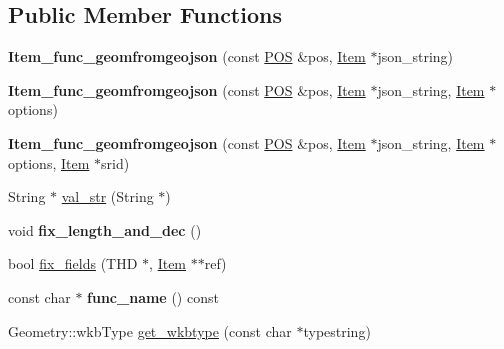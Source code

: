 \subsection*{Public Member Functions}
\begin{DoxyCompactItemize}
\item 
\mbox{\label{classItem__func__geomfromgeojson_aeb116792c0b6068b50ee6f39e3553de6}} 
{\bfseries Item\+\_\+func\+\_\+geomfromgeojson} (const \mbox{\hyperlink{structYYLTYPE}{P\+OS}} \&pos, \mbox{\hyperlink{classItem}{Item}} $\ast$json\+\_\+string)
\item 
\mbox{\label{classItem__func__geomfromgeojson_a93fccb34e1f16151349f31d7d062c2e0}} 
{\bfseries Item\+\_\+func\+\_\+geomfromgeojson} (const \mbox{\hyperlink{structYYLTYPE}{P\+OS}} \&pos, \mbox{\hyperlink{classItem}{Item}} $\ast$json\+\_\+string, \mbox{\hyperlink{classItem}{Item}} $\ast$options)
\item 
\mbox{\label{classItem__func__geomfromgeojson_abfac62c4f62832e95f8b1940ed6ff657}} 
{\bfseries Item\+\_\+func\+\_\+geomfromgeojson} (const \mbox{\hyperlink{structYYLTYPE}{P\+OS}} \&pos, \mbox{\hyperlink{classItem}{Item}} $\ast$json\+\_\+string, \mbox{\hyperlink{classItem}{Item}} $\ast$options, \mbox{\hyperlink{classItem}{Item}} $\ast$srid)
\item 
String $\ast$ \mbox{\hyperlink{classItem__func__geomfromgeojson_a6b2fff2154b1698c3fd3dfceaf3fa879}{val\+\_\+str}} (String $\ast$)
\item 
\mbox{\label{classItem__func__geomfromgeojson_a9ba0eb653762a975048ac1b0197e32c2}} 
void {\bfseries fix\+\_\+length\+\_\+and\+\_\+dec} ()
\item 
bool \mbox{\hyperlink{classItem__func__geomfromgeojson_ab149d10aad09cc883fda14a95e340059}{fix\+\_\+fields}} (T\+HD $\ast$, \mbox{\hyperlink{classItem}{Item}} $\ast$$\ast$ref)
\item 
\mbox{\label{classItem__func__geomfromgeojson_a7239b1fbdce6e21f0c236df2187de5e7}} 
const char $\ast$ {\bfseries func\+\_\+name} () const
\item 
Geometry\+::wkb\+Type \mbox{\hyperlink{classItem__func__geomfromgeojson_a9ec31316d137714186930bc2a29b0f2c}{get\+\_\+wkbtype}} (const char $\ast$typestring)
$$
\end{DoxyCompactItemize}
